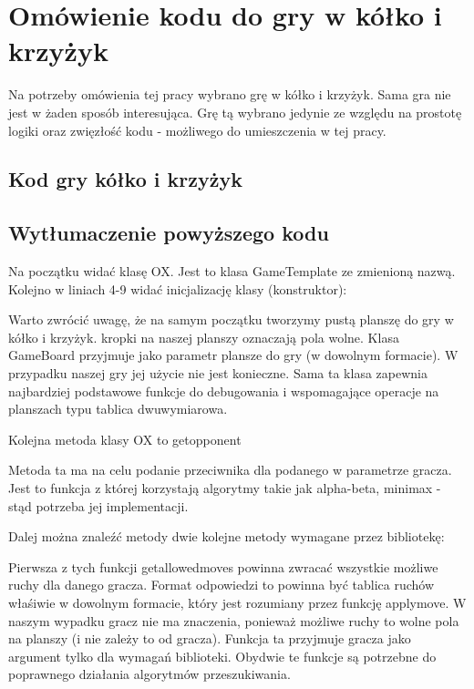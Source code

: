 \documentclass[polish,shortabstract,inz]{iithesis}
\begin{document}
\section{Omówienie kodu do gry w kółko i krzyżyk}
Na potrzeby omówienia tej pracy wybrano grę w kółko i krzyżyk.
Sama gra nie jest w żaden sposób interesująca.
Grę tą wybrano jedynie ze względu na prostotę logiki oraz zwięzłość kodu - możliwego do umieszczenia w tej pracy.
\subsection{Kod gry kółko i krzyżyk}

\subsection{Wytłumaczenie powyższego kodu}
Na początku widać klasę OX. Jest to klasa GameTemplate ze zmienioną nazwą.
Kolejno w liniach 4-9 widać inicjalizację klasy (konstruktor):

Warto zwrócić uwagę, że na samym początku tworzymy pustą planszę do gry w kółko i krzyżyk.
kropki na naszej planszy oznaczają pola wolne.
Klasa GameBoard przyjmuje jako parametr plansze do gry (w dowolnym formacie).
W przypadku naszej gry jej użycie nie jest konieczne.
Sama ta klasa zapewnia najbardziej podstawowe funkcje do debugowania i wspomagające operacje na planszach typu tablica dwuwymiarowa.

Kolejna metoda klasy OX to get\textunderscore opponent

Metoda ta ma na celu podanie przeciwnika dla podanego w parametrze gracza.
Jest to funkcja z której korzystają algorytmy takie jak alpha-beta, minimax - stąd potrzeba jej implementacji.

Dalej można znaleźć metody dwie kolejne metody wymagane przez bibliotekę:


Pierwsza z tych funkcji get\textunderscore allowed\textunderscore moves powinna zwracać wszystkie możliwe ruchy dla danego gracza.
Format odpowiedzi to powinna być tablica ruchów właśiwie w dowolnym formacie, który jest rozumiany przez funkcję apply\textunderscore move.
W naszym wypadku gracz nie ma znaczenia, ponieważ możliwe ruchy to wolne pola na planszy (i nie zależy to od gracza).
Funkcja ta przyjmuje gracza jako argument tylko dla wymagań biblioteki.
Obydwie te funkcje są potrzebne do poprawnego działania algorytmów przeszukiwania.
\end{document}

